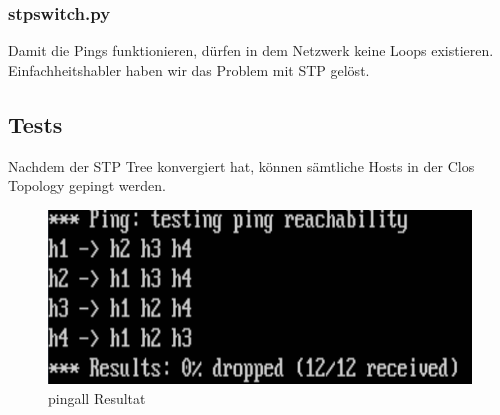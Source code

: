 \subsubsection{stpswitch.py}
Damit die Pings funktionieren, dürfen in dem Netzwerk keine Loops existieren. Einfachheitshabler haben wir das Problem mit STP gelöst. 



\subsection{Tests}
Nachdem der STP Tree konvergiert hat, können sämtliche Hosts in der Clos Topology gepingt werden.
\begin{figure}[h]
\centering
\includegraphics[width=0.7\linewidth]{images/ping_result}
\caption{pingall Resultat}
\label{fig:pingresult}
\end{figure}





